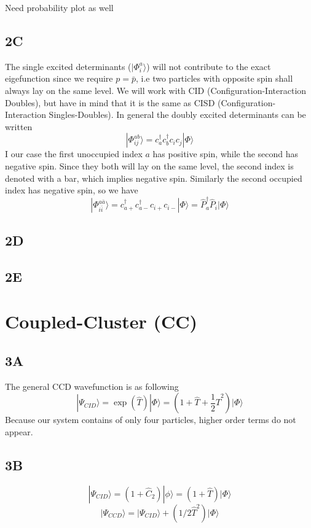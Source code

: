 \documentclass[norsk,a4paper,12pt]{article}
\begin{document}
Need probability plot as well

\subsection*{2C}
The single excited determinants ($|\Phi_i^a\rangle$) will not contribute to the exact eigefunction since we require $p=\bar{p}$, i.e two particles with opposite spin shall always lay on the same level. We will work with CID (Configuration-Interaction Doubles), but have in mind that it is the same as CISD (Configuration-Interaction Singles-Doubles). In general the doubly excited determinants can be written
\begin{equation}
|\Phi_{ij}^{ab}\rangle=c_a^{\dagger}c_b^{\dagger}c_ic_j|\Phi\rangle
\end{equation}
I our case the first unoccupied index $a$ has positive spin, while the second has negative spin. Since they both will lay on the same level, the second index is denoted with a bar, which implies negative spin. Similarly the second occupied index has negative spin, so we have
\begin{equation}
|\Phi_{i\bar{i}}^{a\bar{a}}\rangle=c_{a+}^{\dagger}c_{a-}^{\dagger}c_{i+}c_{i-}|\Phi\rangle=\hat{P}_a^{\dagger}\hat{P}_i|\Phi\rangle
\end{equation}

\subsection*{2D}
\subsection*{2E}

\section{Coupled-Cluster (CC)}
\subsection*{3A}
The general CCD wavefunction is as following
\begin{equation}
|\Psi_{CID}\rangle=\exp{(\hat{T})}|\Phi\rangle=(1+\hat{T}+\frac{1}{2}\hat{T}^2)|\Phi\rangle
\end{equation}
Because our system contains of only four particles, higher order terms do not appear. 

\subsection*{3B}
\begin{equation}
|\Psi_{CID}\rangle=(1+\hat{C}_2)|\phi\rangle=(1+\hat{T})|\Phi\rangle
\end{equation}
\begin{equation}
|\Psi_{CCD}\rangle=|\Psi_{CID}\rangle+(1/2\hat{T}^2)|\Phi\rangle
\end{equation}
\end{document}
